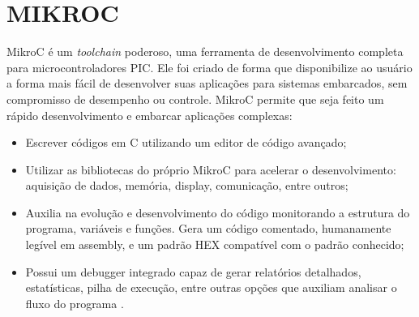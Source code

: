 \section{MIKROC}
MikroC é um \emph{toolchain} poderoso, uma ferramenta de desenvolvimento completa para microcontroladores PIC. Ele foi criado de forma que disponibilize ao usuário a forma mais fácil de desenvolver suas aplicações para sistemas embarcados, sem compromisso de desempenho ou controle. MikroC permite que seja feito um rápido desenvolvimento e embarcar aplicações complexas:

\begin{itemize}
\item Escrever códigos em C utilizando um editor de código avançado;
\item Utilizar as bibliotecas do próprio MikroC para acelerar o desenvolvimento: aquisição de dados, memória, display, comunicação, entre outros;
\item Auxilia na evolução e desenvolvimento do código monitorando a estrutura do programa, variáveis e funções. Gera um código comentado, humanamente legível em assembly, e um padrão HEX compatível com o padrão conhecido;
\item Possui um debugger integrado capaz de gerar relatórios detalhados, estatísticas, pilha de execução, entre outras opções que auxiliam analisar o fluxo do programa \cite{mikroc2006}.
\end{itemize}